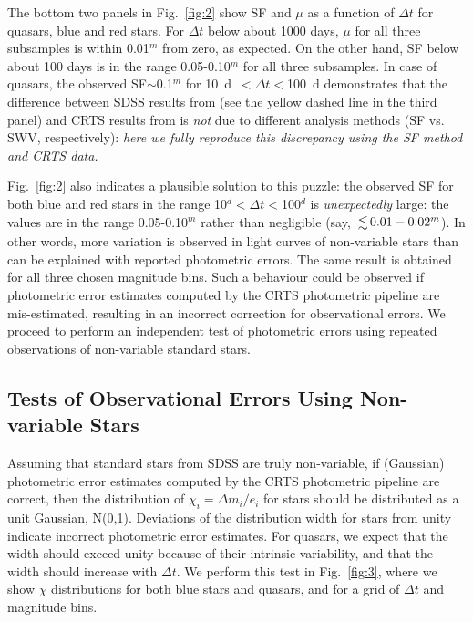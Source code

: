 \documentclass[fleqn,usenatbib]{mnras}
\begin{document}
The bottom two panels in Fig.~\ref{fig:2} show SF and $\mu$ as a function of $\Delta t$ for quasars, blue 
and red stars. For $\Delta t$ below about 1000 days, $\mu$ for all three subsamples is within 0.01$^m$
from zero, as expected. On the other hand, SF below about 100 days is in the range 0.05-0.10$^m$ for
all three subsamples. In case of quasars, the observed SF$\sim$0.1$^m$ for \mbox{10 d $<\Delta t<$100 d}
demonstrates that the difference between SDSS results from \cite{macleod2010} (see the yellow dashed
line in the third panel) and CRTS results from \cite{graham2014} is {\it not} due to different analysis 
methods (SF vs. SWV, respectively): {\it here we fully reproduce this discrepancy using the SF method and 
CRTS data.} 

Fig.~\ref{fig:2} also indicates a plausible solution to this puzzle: the observed SF for both blue and red
stars in the range \mbox{10$^d<\Delta t<$100$^d$} is {\it unexpectedly} large: the values are in the range 
0.05-0.10$^m$ rather than negligible (say, $\la 0.01-0.02^m$). In other words, more variation is 
observed in light curves of non-variable stars than can be explained with reported photometric errors.
The same result is obtained for all three chosen magnitude bins. Such a behaviour could be observed if 
photometric error estimates computed by the CRTS photometric pipeline are mis-estimated, resulting
in an incorrect correction for observational errors. We proceed to perform an independent test of 
photometric errors using repeated observations of non-variable standard stars. 


\subsection{Tests of Observational Errors Using Non-variable Stars}
\label{sec:results}

Assuming that standard stars from SDSS are truly non-variable, if (Gaussian) photometric error estimates 
computed by the CRTS photometric pipeline are correct, then the distribution of $\chi_i= \Delta m_i / e_i$ 
for stars should be distributed as a unit Gaussian, N(0,1). Deviations of the distribution width for stars 
from unity indicate incorrect photometric error estimates. For quasars, we expect that the width should
exceed unity because of their intrinsic variability, and that the width should increase with $\Delta t$. 
We perform this test in Fig.~\ref{fig:3}, where we show $\chi$ distributions for both blue stars and quasars, 
and for a grid of $\Delta t$ and magnitude bins. 
\end{document}

